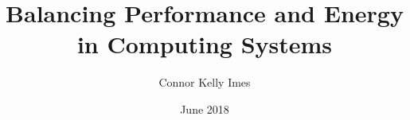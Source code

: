\documentclass{ucetd}
\title{Balancing Performance and Energy in Computing Systems}
\author{Connor Kelly Imes}
\date{June 2018}
\begin{document}
\maketitle

\makecopyright


\tableofcontents
\listoffigures
\listoftables

\acknowledgments




\mainmatter







\appendix



\begin{singlespace}
\setlength\bibitemsep{\etdPtSize}
\printbibliography[heading=bibintoc]
\end{singlespace}
\end{document}
